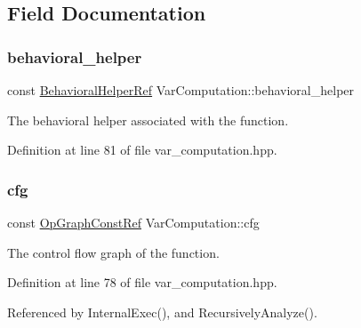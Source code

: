 \subsection{Field Documentation}
\mbox{\label{classVarComputation_a8b2e4fafbd38459bd4237d0774a5f837}} 
\subsubsection{\texorpdfstring{behavioral\+\_\+helper}{behavioral\_helper}}
{\footnotesize\ttfamily const \hyperlink{behavioral__helper_8hpp_a9da8798985d185e76cbde965d9d68f84}{Behavioral\+Helper\+Ref} Var\+Computation\+::behavioral\+\_\+helper\hspace{0.3cm}{\ttfamily [private]}}



The behavioral helper associated with the function. 



Definition at line 81 of file var\+\_\+computation.\+hpp.

\mbox{\label{classVarComputation_aacd88a39d84c8c91bb04a81a18f360ba}} 
\subsubsection{\texorpdfstring{cfg}{cfg}}
{\footnotesize\ttfamily const \hyperlink{op__graph_8hpp_a9a0b240622c47584bee6951a6f5de746}{Op\+Graph\+Const\+Ref} Var\+Computation\+::cfg\hspace{0.3cm}{\ttfamily [private]}}



The control flow graph of the function. 



Definition at line 78 of file var\+\_\+computation.\+hpp.



Referenced by Internal\+Exec(), and Recursively\+Analyze().

\mbox{\label{classVarComputation_ab8ed2054d3cc29ed938c02ab3ec8c319}} 
